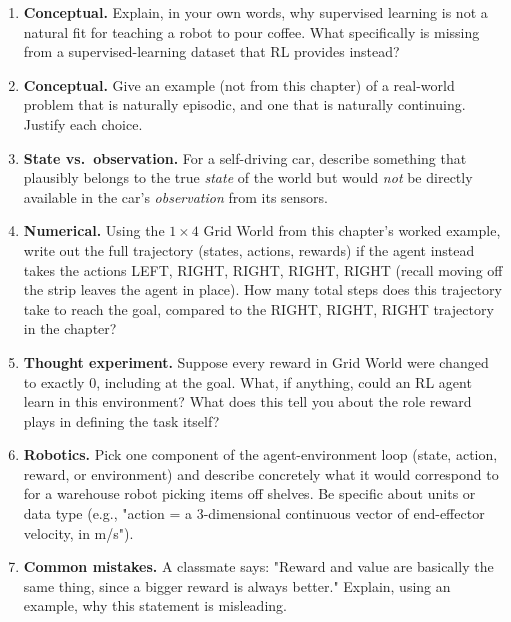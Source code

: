 
\begin{enumerate}
  \item \textbf{Conceptual.} Explain, in your own words, why supervised
  learning is not a natural fit for teaching a robot to pour coffee.
  What specifically is missing from a supervised-learning dataset that RL
  provides instead?

  \item \textbf{Conceptual.} Give an example (not from this chapter) of a
  real-world problem that is naturally episodic, and one that is
  naturally continuing. Justify each choice.

  \item \textbf{State vs.\ observation.} For a self-driving car, describe
  something that plausibly belongs to the true \emph{state} of the world
  but would \emph{not} be directly available in the car's
  \emph{observation} from its sensors.

  \item \textbf{Numerical.} Using the $1\times4$ Grid World from this
  chapter's worked example, write out the full trajectory (states,
  actions, rewards) if the agent instead takes the actions
  LEFT, RIGHT, RIGHT, RIGHT, RIGHT (recall moving off the strip leaves
  the agent in place). How many total steps does this trajectory take
  to reach the goal, compared to the RIGHT, RIGHT, RIGHT trajectory in
  the chapter?

  \item \textbf{Thought experiment.} Suppose every reward in Grid World
  were changed to exactly $0$, including at the goal. What, if anything,
  could an RL agent learn in this environment? What does this tell you
  about the role reward plays in defining the task itself?

  \item \textbf{Robotics.} Pick one component of the agent-environment
  loop (state, action, reward, or environment) and describe concretely
  what it would correspond to for a warehouse robot picking items off
  shelves. Be specific about units or data type (e.g., "action = a
  3-dimensional continuous vector of end-effector velocity, in m/s").

  \item \textbf{Common mistakes.} A classmate says: "Reward and value are
  basically the same thing, since a bigger reward is always better."
  Explain, using an example, why this statement is misleading.
\end{enumerate}
